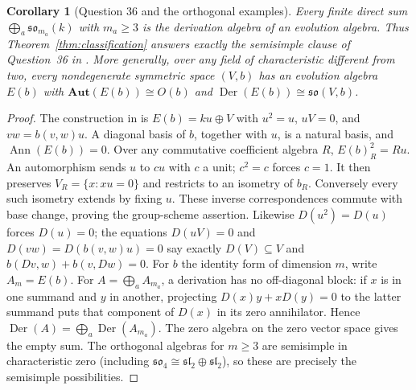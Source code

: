 \documentclass[11pt]{article}
\newtheorem{corollary}[theorem]{Corollary}
\DeclareMathOperator{\Der}{Der}
\DeclareMathOperator{\Ann}{Ann}
\newcommand{\so}{\mathfrak{so}}
\newcommand{\slie}{\mathfrak{sl}}
\begin{document}
\begin{corollary}[Question 36 and the orthogonal examples]\label{cor:converse}
Every finite direct sum $\bigoplus_a\so_{m_a}(k)$ with $m_a\ge3$ is the
derivation algebra of an evolution algebra. Thus Theorem~\ref{thm:classification}
answers exactly the semisimple clause of Question~36 in \cite[\S2.2.5, p.~25]{survey}.
More generally, over any field of characteristic different from two, every
nondegenerate symmetric space $(V,b)$ has an evolution algebra $E(b)$ with
$\mathbf{Aut}(E(b))\cong O(b)$ and $\Der(E(b))\cong\so(V,b)$.
\end{corollary}
\begin{proof}
The construction in \cite[Proposition~14 and Remark~15, pp.~13--14]{survey}
is $E(b)=ku\oplus V$ with $u^2=u$, $uV=0$, and $vw=b(v,w)u$.
A diagonal basis of $b$, together with $u$, is a natural basis, and
$\Ann(E(b))=0$. Over any commutative coefficient algebra $R$,
$E(b)_R^2=Ru$. An automorphism sends $u$ to $cu$ with $c$ a unit;
$c^2=c$ forces $c=1$. It then preserves
$V_R=\{x:xu=0\}$ and restricts to an isometry of $b_R$.
Conversely every such isometry extends by fixing $u$.
These inverse correspondences commute with base change, proving the
group-scheme assertion. Likewise $D(u^2)=D(u)$ forces $D(u)=0$;
the equations $D(uV)=0$ and $D(vw)=D(b(v,w)u)=0$ say exactly
$D(V)\subseteq V$ and $b(Dv,w)+b(v,Dw)=0$.
For $b$ the identity form of dimension $m$, write $A_m=E(b)$.
For $A=\bigoplus_a A_{m_a}$, a derivation has no off-diagonal block:
if $x$ is in one summand and $y$ in another, projecting
$D(x)y+xD(y)=0$ to the latter summand puts that component of $D(x)$ in
its zero annihilator. Hence $\Der(A)=\bigoplus_a\Der(A_{m_a})$.
The zero algebra on the zero vector space gives the empty sum.
The orthogonal algebras for $m\ge3$ are semisimple in characteristic zero
(including $\so_4\cong\slie_2\oplus\slie_2$), so these are precisely the
semisimple possibilities.
\end{proof}
\end{document}
